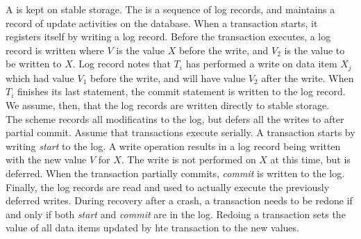 \documentclass{article}
\begin{document}
A  is kept on stable storage. The  is a sequence of log records, and maintains a record of update activities on the database. When a transaction starts, it registers itself by writing a log record. Before the transaction executes, a log record is written where $V$ is the value $X$ before the write, and $V_2$ is the value to be written to $X$. Log record notes that $T_i$ has performed a write on data item $X_j$ which had value $V_1$ before the write, and will have value $V_2$ after the write. When $T_i$ finishes its last statement, the commit statement is written to the log record. We assume, then, that the log records are written directly to stable storage. \\ 

The  scheme records all modificatins to the log, but defers all the writes to after partial commit. Assume that transactions execute serially. A transaction starts by writing \emph{start} to the log. A write operation results in a log record being written with the new value $V$ for $X$. The write is not performed on $X$ at this time, but is deferred. When the transaction partially commits, \emph{commit} is written to the log. Finally, the log records are read and used to actually execute the previously deferred writes. During recovery after a crash, a transaction needs to be redone if and only if both \emph{start} and \emph{commit} are in the log. Redoing a transaction sets the value of all data items updated by hte transaction to the new values. \\ 
\end{document}
